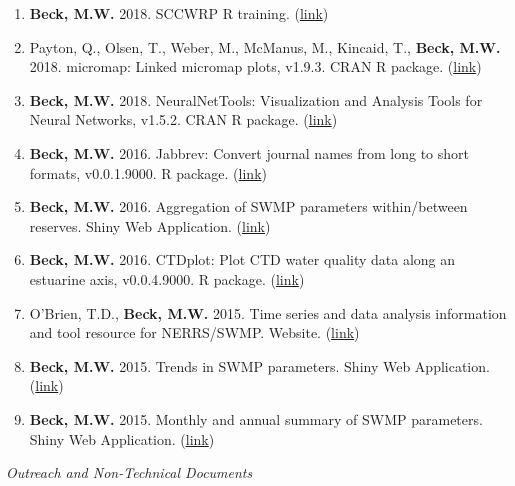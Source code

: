\documentclass[letterpaper,12pt]{article}
\begin{document}
\begin{enumerate}
\item \textbf{Beck, M.W.} 2018. SCCWRP R training. ({\footnotesize\href{https://sccwrp.github.io/SCCWRP_R_training/}{link}})

\item Payton, Q., Olsen, T., Weber, M., McManus, M., Kincaid, T., \textbf{Beck, M.W.} 2018. micromap: Linked micromap plots, v1.9.3. CRAN R package. ({\footnotesize\href{https://cran.r-project.org/web/packages/micromap/index.html}{link}})

\item \textbf{Beck, M.W.} 2018. NeuralNetTools: Visualization and Analysis Tools for Neural Networks, v1.5.2. CRAN R package. ({\footnotesize\href{http://cran.r-project.org/web/packages/NeuralNetTools/}{link}})

\item \textbf{Beck, M.W.} 2016. Jabbrev: Convert journal names from long to short formats, v0.0.1.9000. R package. ({\footnotesize\href{https://github.com/fawda123/Jabbrev}{link}})

\item \textbf{Beck, M.W.} 2016. Aggregation of SWMP parameters within/between reserves. Shiny Web Application. ({\footnotesize\href{http://beckmw.shinyapps.io/swmp_agg}{link}})

\item \textbf{Beck, M.W.} 2016. CTDplot: Plot CTD water quality data along an estuarine axis, v0.0.4.9000. R package. ({\footnotesize\href{https://github.com/fawda123/CTDplot}{link}})

\item O'Brien, T.D., \textbf{Beck, M.W.} 2015. Time series and data analysis information and tool resource for NERRS/SWMP. Website. ({\footnotesize\href{http://swmprats.net/}{link}})

\item \textbf{Beck, M.W.} 2015. Trends in SWMP parameters. Shiny Web Application. ({\footnotesize\href{http://beckmw.shinyapps.io/swmp_comp/}{link}})

\item \textbf{Beck, M.W.} 2015. Monthly and annual summary of SWMP parameters. Shiny Web Application. ({\footnotesize\href{http://beckmw.shinyapps.io/swmp_summary/}{link}})

\end{enumerate}

\vspace{\baselineskip} 
\centerline{\large{\textit{Outreach and Non-Technical Documents}}}
\end{document}
